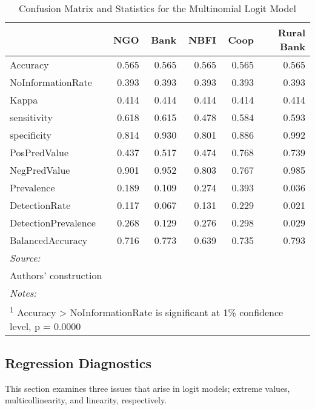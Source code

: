 \documentclass[a4paper,nobind]{templates/ociamthesis}
\begin{document}
\begin{table}

\caption{\label{tab:unnamed-chunk-29}Confusion Matrix and Statistics for the Multinomial Logit Model}
\centering
\begin{tabular}[t]{lrrrrr}
\toprule
  & NGO & Bank & NBFI & Coop & Rural Bank\\
\midrule
Accuracy & 0.565 & 0.565 & 0.565 & 0.565 & 0.565\\
NoInformationRate & 0.393 & 0.393 & 0.393 & 0.393 & 0.393\\
Kappa & 0.414 & 0.414 & 0.414 & 0.414 & 0.414\\
sensitivity & 0.618 & 0.615 & 0.478 & 0.584 & 0.593\\
specificity & 0.814 & 0.930 & 0.801 & 0.886 & 0.992\\
\addlinespace
PosPredValue & 0.437 & 0.517 & 0.474 & 0.768 & 0.739\\
NegPredValue & 0.901 & 0.952 & 0.803 & 0.767 & 0.985\\
Prevalence & 0.189 & 0.109 & 0.274 & 0.393 & 0.036\\
DetectionRate & 0.117 & 0.067 & 0.131 & 0.229 & 0.021\\
DetectionPrevalence & 0.268 & 0.129 & 0.276 & 0.298 & 0.029\\
\addlinespace
BalancedAccuracy & 0.716 & 0.773 & 0.639 & 0.735 & 0.793\\
\bottomrule
\multicolumn{6}{l}{\rule{0pt}{1em}\textit{Source: }}\\
\multicolumn{6}{l}{\rule{0pt}{1em}Authors' construction}\\
\multicolumn{6}{l}{\rule{0pt}{1em}\textit{Notes: }}\\
\multicolumn{6}{l}{\rule{0pt}{1em}\textsuperscript{1} Accuracy > NoInformationRate is significant at 1\% confidence level, p = 0.0000}\\
\end{tabular}
\end{table}

\newpage

\hypertarget{regression-diagnostics}{%
\subsection{Regression Diagnostics}\label{regression-diagnostics}}

This section examines three issues that arise in logit models; extreme values, multicollinearity, and linearity, respectively.
\end{document}
